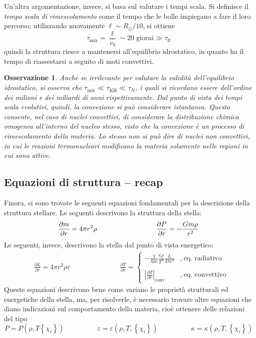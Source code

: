 \documentclass[11pt, a4paper]{scrartcl}
\theoremstyle{style}
\newtheorem{osservazione}{Osservazione}[section]
\theoremstyle{style1}
\numberwithin{equation}{subsection}
\begin{document}
Un'altra argomentazione, invece, si basa sul valutare i tempi scala.
Si definisce il \textit{tempo scala di rimescolamento} come il tempo che le bolle impiegano a fare il loro percorso; utilizzando nuovamente $\ell \sim R_\odot / 10$, si ottiene 
\[
\tau _\text{mix} = \frac{\ell }{v_b} \sim 20 \text{ giorni} \gg \tau _\text{ff}
\] 
quindi la struttura riesce a mantenersi all'equilibrio idrostatico, in quanto ha il tempo di riassestarsi a seguito di moti convettivi.
\begin{osservazione}
	Anche se irrilevante per valutare la validit\`a dell'equilibrio idrostatico, si osserva che $\tau _\text{mix} \ll \tau _\text{KH} \ll \tau _N$, i quali si ricordano essere dell'ordine dei milioni e dei miliardi di anni rispettivamente.
	Dal punto di vista dei tempi scala evolutivi, quindi, la convezione si pu\`o considerare istantanea.
	Questo consente, nel caso di nuclei convettivi, di considerare la distribuzione chimica omogenea all'interno del nucleo stesso, visto che la convezione \`e un processo di rimescolamento della materia.
	Lo stesso non si pu\`o dire di nuclei non convettivi, in cui le reazioni termonucleari modificano la materia solamente nelle regioni in cui sono attive.
\end{osservazione}
\subsection{Equazioni di struttura -- recap}
Finora, si sono trovate le seguenti equazioni fondamentali per la descrizione della struttura stellare.
Le seguenti descrivono la struttura della stella:
\[
		\frac{\partial m}{\partial r} = 4 \pi r ^2 \rho   \hspace{3cm}\frac{\partial P}{\partial r} = - \frac{Gm \rho }{r^2} \\
\] 
Le seguenti, invece, descrivono la stella dal punto di vista energetico:
\[
	\begin{split}
		&\frac{\partial L}{\partial r} = 4 \pi r^2 \rho  \varepsilon \hspace{3cm} \frac{\partial T}{\partial r} = \begin{cases}
			\displaystyle - \frac{3}{4ac} \frac{\overline{\kappa }\rho }{T^3} \frac{L}{4 \pi r^2}&,\ \text{eq. radiativo}\\
			\\
			\displaystyle \left\lvert \frac{\partial T}{\partial r}  \right\rvert _\text{conv} &,\ \text{eq. convettivo}
		\end{cases}
	\end{split}
\] 
Queste equazioni descrivono bene come variano le propriet\`a strutturali ed energetiche della stella, ma, per risolverle, \`e necessario trovare altre equazioni che diano indicazioni sul comportamento della materia, cio\`e ottenere delle relazioni del tipo 
\[
P = P(\rho ,T \left\{ \chi _i \right\} ) \hspace{2cm} \varepsilon =\varepsilon (\rho , T , \left\{ \chi _i \right\} ) \hspace{2cm} \kappa = \kappa (\rho ,T ,\left\{ \chi _i \right\} )
\] 
\end{document}
